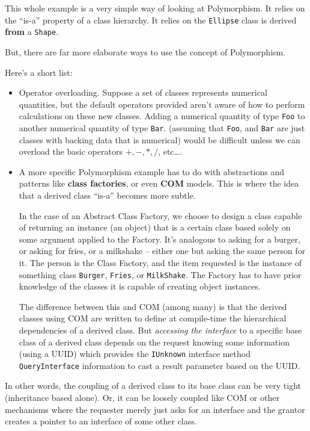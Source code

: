 \documentclass[12pt]{article}
\begin{document}
\begin{enumerate}
\begin{enumerate}
This whole example is a very simple way of looking at Polymorphism.
It relies on the ``is-a'' property of a class hierarchy.  It relies on
the {\texttt{Ellipse}} class is derived {\textbf{from}} a {\texttt{Shape}}.
\par
But, there are far more elaborate ways to use the concept of Polymorphism.

Here's a short list:

\begin{itemize}
\item Operator overloading.  Suppose a set of classes represents numerical
quantities, but the default operators provided aren't aware of how to
perform calculations on these new classes.   Adding a numerical quantity of
type {\texttt{Foo}} to another numerical quantity of type {\texttt{Bar}}.
(assuming that {\texttt{Foo}}, and {\texttt{Bar}} are just classes
with backing data that is numerical) would be difficult unless we can
overload the basic operators $+, -, *, /$, etc\ldots.
\item A more specific Polymorphism example has to do with abstractions
and patterns like {\textbf{class factories}}, or even {\textbf{COM}}
models.  This is where the idea that a derived class ``is-a'' becomes
more subtle.

In the case of an Abstract Class Factory, we choose to design a class
capable of returning an instance (an object) that is a certain class
based solely on some argument applied to the Factory.    It's analogous
to asking for a burger, or asking for fries, or a milkshake -- either one
but asking the same person for it.  The person is the Class Factory,
and the item requested is the instance of something class {\texttt{Burger}},
{\texttt{Fries}}, or {\texttt{MilkShake}}.  The Factory has to
have prior knowledge of the classes it is capable of creating object
instances.
\par
The difference between this and COM (among many) is that the derived
classes using COM are written to define at compile-time the hierarchical
dependencies of a derived class.  But {\textit{accessing the interface}}
to a specific base class of a derived class depends on the request knowing
some information (using a UUID) which provides the {\texttt{IUnknown}}
interface method {\texttt{QueryInterface}} information to cast
a result parameter based on the UUID.
\end{itemize}

In other words, the coupling of a derived class to its base class can
be very tight (inheritance based alone).  Or, it can be loosely
coupled like COM or other mechanisms where the requester merely just
asks for an interface and the grantor creates a pointer to an interface
of some other class.


\end{enumerate}
\end{enumerate}
\end{document}
